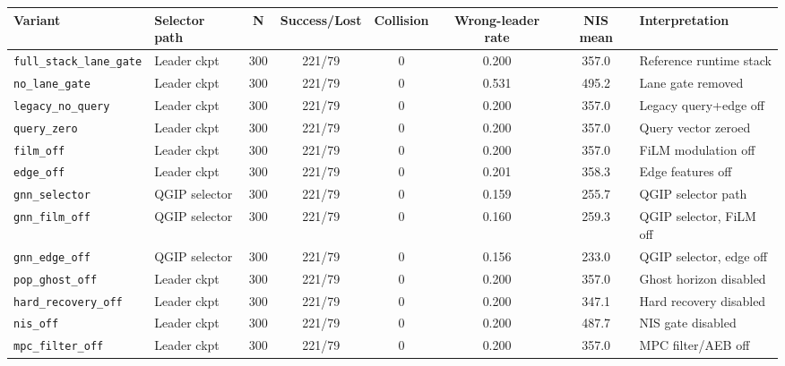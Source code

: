 \begin{tabular}{l l c c c c c l}
\hline
Variant & Selector path & N & Success/Lost & Collision & Wrong-leader rate & NIS mean & Interpretation \\
\hline
\texttt{full\_stack\_lane\_gate} & Leader ckpt & 300 & 221/79 & 0 & 0.200 & 357.0 & Reference runtime stack \\
\texttt{no\_lane\_gate} & Leader ckpt & 300 & 221/79 & 0 & 0.531 & 495.2 & Lane gate removed \\
\texttt{legacy\_no\_query} & Leader ckpt & 300 & 221/79 & 0 & 0.200 & 357.0 & Legacy query+edge off \\
\texttt{query\_zero} & Leader ckpt & 300 & 221/79 & 0 & 0.200 & 357.0 & Query vector zeroed \\
\texttt{film\_off} & Leader ckpt & 300 & 221/79 & 0 & 0.200 & 357.0 & FiLM modulation off \\
\texttt{edge\_off} & Leader ckpt & 300 & 221/79 & 0 & 0.201 & 358.3 & Edge features off \\
\texttt{gnn\_selector} & QGIP selector & 300 & 221/79 & 0 & 0.159 & 255.7 & QGIP selector path \\
\texttt{gnn\_film\_off} & QGIP selector & 300 & 221/79 & 0 & 0.160 & 259.3 & QGIP selector, FiLM off \\
\texttt{gnn\_edge\_off} & QGIP selector & 300 & 221/79 & 0 & 0.156 & 233.0 & QGIP selector, edge off \\
\texttt{pop\_ghost\_off} & Leader ckpt & 300 & 221/79 & 0 & 0.200 & 357.0 & Ghost horizon disabled \\
\texttt{hard\_recovery\_off} & Leader ckpt & 300 & 221/79 & 0 & 0.200 & 347.1 & Hard recovery disabled \\
\texttt{nis\_off} & Leader ckpt & 300 & 221/79 & 0 & 0.200 & 487.7 & NIS gate disabled \\
\texttt{mpc\_filter\_off} & Leader ckpt & 300 & 221/79 & 0 & 0.200 & 357.0 & MPC filter/AEB off \\
\hline
\end{tabular}
